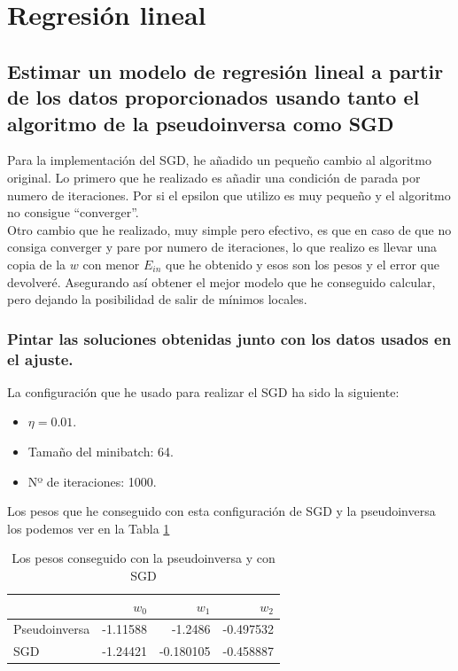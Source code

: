 \documentclass[12pt,a4paper]{article}
\begin{document}
\section{Regresión lineal}
\subsection{Estimar un modelo de regresión lineal a partir de los datos proporcionados usando tanto el algoritmo de la pseudoinversa como  SGD}
Para la implementación del SGD, he añadido un pequeño cambio al algoritmo original. Lo primero que he realizado es añadir una condición de parada por numero de iteraciones. Por si el epsilon que utilizo es muy pequeño y el algoritmo no consigue ``converger''. \\Otro cambio que he realizado, muy simple pero efectivo, es que en caso de que no consiga converger y pare por numero de iteraciones, lo que realizo es llevar una copia de la $w$ con menor $E_{in}$ que he obtenido y esos son los pesos y el error que devolveré. Asegurando así obtener el mejor modelo que he conseguido calcular, pero dejando la posibilidad de salir de mínimos locales.
\subsubsection{ Pintar las soluciones obtenidas junto con los datos usados en el ajuste.}
La configuración que he usado para realizar el SGD ha sido la siguiente:
\begin{itemize}
	\item $\eta=0.01$.
	\item Tamaño del minibatch: 64.
	\item Nº de iteraciones: 1000.
\end{itemize}
Los pesos que he conseguido con esta configuración de SGD y la pseudoinversa los podemos ver en la Tabla \ref{tab:pesos}
	
\begin{table}[H]
	\centering
	\caption {Los pesos conseguido con la pseudoinversa y con SGD} \label{tab:pesos} 
	
	\begin{tabular}{|l|r|r|r|}
		\hline
		\backslashbox{Método}{Pesos} & $w_0$ & $w_1$ & $w_2$\\ 
		\hline
		Pseudoinversa & -1.11588 & -1.2486  &-0.497532 \\
		\hline
		SGD & -1.24421 & -0.180105 & -0.458887\\
		\hline
	\end{tabular}
\end{table}
\end{document}
